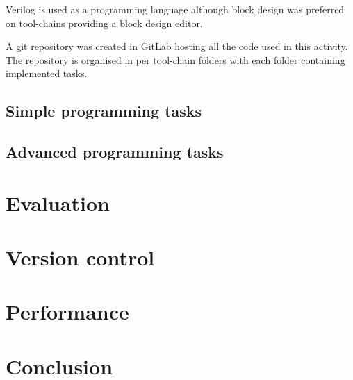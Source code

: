 \documentclass[12pt]{report}
\begin{document}
{Verilog is used as a programming language although block design was preferred on tool-chains providing a block design editor.

A git repository was created in GitLab hosting all the code used in this activity. The repository is organised in per tool-chain folders with each folder containing implemented tasks.
\section{Simple programming tasks}


\section{Advanced programming tasks}


\chapter{Evaluation}


\chapter{Version control}


\chapter{Performance}
\label{performance}


\chapter{Conclusion}
\label{conclusion}

\newpage





}
\end{document}
